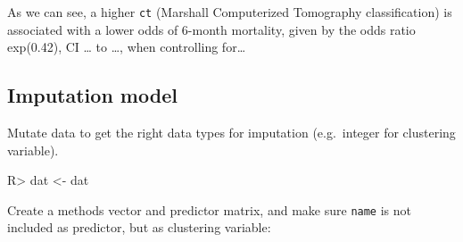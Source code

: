 \documentclass[
]{jss}
\begin{document}
As we can see, a higher \texttt{ct} (Marshall Computerized Tomography
classification) is associated with a lower odds of 6-month mortality,
given by the odds ratio exp(0.42), CI \ldots{} to \ldots, when
controlling for\ldots{}

\hypertarget{imputation-model}{%
\subsection{Imputation model}\label{imputation-model}}

Mutate data to get the right data types for imputation (e.g.~integer for
clustering variable).

\begin{CodeChunk}
\begin{CodeInput}
R> dat <- dat %
\end{CodeInput}
\end{CodeChunk}

Create a methods vector and predictor matrix, and make sure
\texttt{name} is not included as predictor, but as clustering variable:
\end{document}
